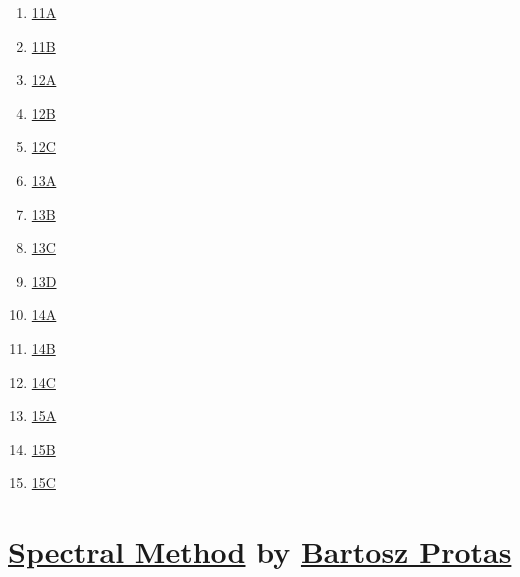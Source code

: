 \documentclass[11pt]{article}
\begin{document}
\begin{multicols}{5}
\begin{enumerate}
		\item \href{https://mp.weixin.qq.com/s/5jvXDp0PxDfeZAAwNK6EKA}{11A}	%
		\item \href{https://mp.weixin.qq.com/s/IKD0guKtmc2SajzQ8EI1tg}{11B}	%
		\item \href{https://mp.weixin.qq.com/s/3iQ-HNWL84XOTg2d-mmOHw}{12A}	%
		\item \href{https://mp.weixin.qq.com/s/SWlbKO7Y8UI9o7l62McGNw}{12B}	%
		\item \href{https://mp.weixin.qq.com/s/RNAWT0JSGUlVfnwL3qeuJA}{12C}	%
		\item \href{https://mp.weixin.qq.com/s/-vadY6SgibpujPGp6Llz5A}{13A}	%
		\item \href{https://mp.weixin.qq.com/s/83DnXmivY5W9iDtkXvs3-A}{13B}	%
		\item \href{https://mp.weixin.qq.com/s/qT7SJItQat0q10MI12KXnA}{13C}	%
		\item \href{https://mp.weixin.qq.com/s/QCZFzmty0WLXGJq54nGOKQ}{13D}	%
		\item \href{https://mp.weixin.qq.com/s/KG-Vu06ZrHWH2rKeIlWYhw}{14A}	%
		\item \href{https://mp.weixin.qq.com/s/5kh2n3YG2tt7APc4qb57nw}{14B}	%
		\item \href{https://mp.weixin.qq.com/s/PIy8EnSu3LrbtD8IfNvp4w}{14C}	%
		\item \href{https://mp.weixin.qq.com/s/tzbOtkaEakK_qmbAOzXosg}{15A}	%
		\item \href{https://mp.weixin.qq.com/s/YEgvTHIX5PpIwrL7APjCmA}{15B}	%
		\item \href{https://mp.weixin.qq.com/s/ZQzCIjSH_nveK6zNEQ-QkQ}{15C}	%
	\end{enumerate}
\end{multicols}

\newpage 

\section[Spectral Methods]{{\large \href{https://www.math.mcmaster.ca/~bprotas/MATH745h/}{Spectral Method}} by {\large \href{https://ms.mcmaster.ca/~bprotas/}{Bartosz Protas}}}
\end{document}
